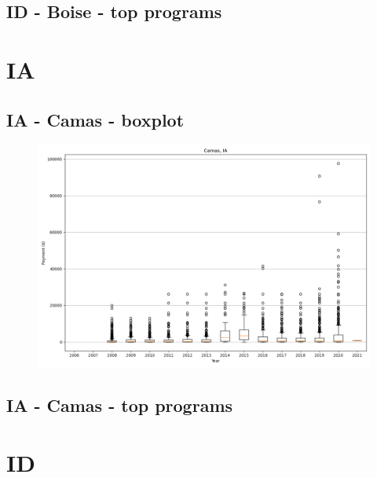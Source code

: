 \subsection*{ID - Boise - top programs}

\newpage
\section*{IA}
\subsection*{IA - Camas - boxplot}
\begin{figure}[h]
\centering
\includegraphics[width=7in]{../output/boxplots/counties/Camas-IA_boxplot.png}
\end{figure}


\subsection*{IA - Camas - top programs}

\newpage
\section*{ID}
